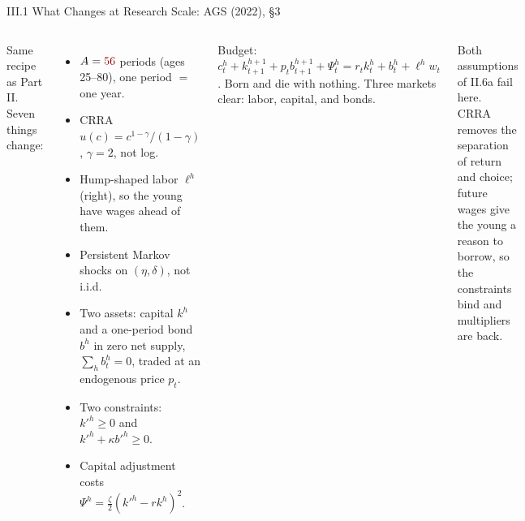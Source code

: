 \documentclass[aspectratio=169,11pt]{beamer}
\newcommand{\emphc}[1]{\textcolor{harvardcrimson}{#1}}
\begin{document}
\begin{frame}{III.1 What Changes at Research Scale: AGS (2022), \S 3}
\scriptsize
\begin{columns}[T]
\emphc{Same recipe as Part II.  Seven things change:}
\begin{itemize}\itemsep0pt
    \item $A = \emphc{56}$ periods (ages 25--80), one period $=$ one year.
    \item CRRA $u(c)=c^{1-\gamma}/(1-\gamma)$, $\gamma = 2$, \emphc{not} log.
    \item \emphc{Hump-shaped} labor $\ell^h$ (right), so the young have wages ahead of them.
    \item \emphc{Persistent} Markov shocks on $(\eta,\delta)$, not i.i.d.
    \item \emphc{Two assets}: capital $k^h$ and a one-period bond $b^h$ in zero net supply,
          $\sum_h b_t^h = 0$, traded at an endogenous price $p_t$.
    \item \emphc{Two constraints}: $k'^h \ge 0$ and $k'^h + \kappa b'^h \ge 0$.
    \item Capital adjustment costs $\Psi^h = \tfrac{\zeta}{2}(k'^h - r k^h)^2$.
\end{itemize}
\vspace{2pt}
{\scriptsize Budget: $c_t^{h} + k_{t+1}^{h+1} + p_t b_{t+1}^{h+1} + \Psi_t^h = r_t k_t^{h} + b_t^{h} + \ell^{h} w_t$.
Born and die with nothing.  Three markets clear: labor, capital, \emphc{and bonds}.}

\centering
{}

{\scriptsize \emphc{Both assumptions of II.6a fail here.}  CRRA removes the separation of return and choice;
future wages give the young a reason to borrow, so the constraints bind and multipliers are back.}
\end{columns}
\end{frame}
\end{document}
